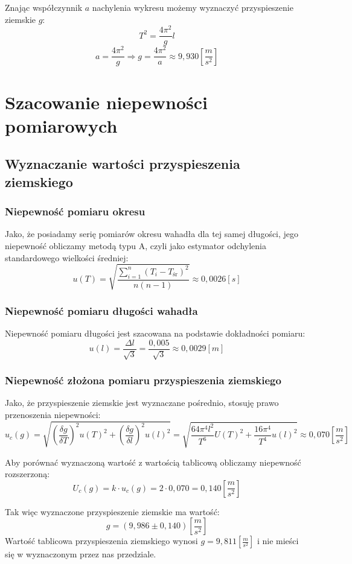 \documentclass [a4paper,11pt]{article}
\begin{document}
Znając współczynnik $a$ nachylenia wykresu możemy wyznaczyć przyspieszenie ziemskie $g$:
$$ T^2 = \frac{4 \pi^2}{g} l $$
$$ a =   \frac{4 \pi^2}{g} \Longrightarrow g= \frac{4 \pi^2}{a}  \approx 9,930 \left[ \frac{m}{s^2}\right]  $$  
\section{Szacowanie niepewności pomiarowych}
\subsection{Wyznaczanie wartości przyspieszenia ziemskiego}
\subsubsection{Niepewność pomiaru okresu}
Jako, że posiadamy serię pomiarów okresu wahadła dla tej samej długości, jego niepewność obliczamy metodą typu A, czyli jako estymator odchylenia standardowego wielkości średniej:
$$ u(T)  = \sqrt{\frac{\sum_{i=1}^{n} \left(T_i - T_{\text{śr}}\right)^2}{n(n-1)}} \approx 0,0026 [s] $$
\subsubsection{Niepewność pomiaru długości wahadła}
Niepewność pomiaru długości jest szacowana na podstawie dokładności pomiaru:
$$u(l) = \frac{\Delta l}{\sqrt{3}} = \frac{0,005}{\sqrt{3}} \approx 0,0029 [m] $$
\subsubsection{Niepewność złożona pomiaru przyspieszenia ziemskiego}
Jako, że przyspieszenie ziemskie jest wyznaczane pośrednio, stosuję prawo przenoszenia niepewności:
$$u_c(g) = \sqrt{\left(  \frac{\delta g}{\delta T} \right)^2 u(T)^2 + \left( \frac{\delta g}{\delta l} \right)^2 u(l)^2  } = \sqrt{\frac{64 \pi^4 l^2}{T^6} U(T)^2 + \frac{16 \pi^4}{T^4} u(l)^2}\approx 0,070 \left[ \frac{m}{s^2} \right] $$

Aby porównać wyznaczoną wartość z wartością tablicową obliczamy niepewność rozszerzoną:
$$U_c(g) = k \cdot u_c(g) = 2 \cdot 0,070 = 0,140 \left[ \frac{m}{s^2} \right] $$
 
Tak więc wyznaczone przyspieszenie ziemskie ma wartość:
$$g = (9,986 \pm 0,140)\left[ \frac{m}{s^2} \right] $$  
Wartość tablicowa przyspieszenia ziemskiego wynosi $g= 9,811 \left[ \frac{m}{s^2} \right] $ i  nie mieści się w wyznaczonym przez nas przedziale.
\end{document}
